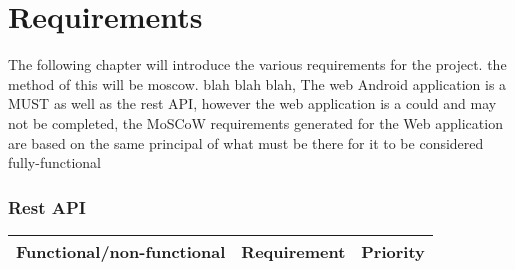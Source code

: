\section{Requirements}
The following chapter will introduce the various requirements for the project. the method of this will be moscow. blah blah blah, The web Android application is a MUST as well as the rest API, however the web application is a could and may not be completed, the MoSCoW requirements generated for the Web application are based on the same principal of what must be there for it to be considered fully-functional

{\renewcommand{\arraystretch}{1.5}}%
\subsubsection{Rest API}
	\begin{tabular}{| p{} | p{} | p{}|}
		\hline
		Functional/non-functional & Requirement & Priority\\\hline
	\end{tabular}
